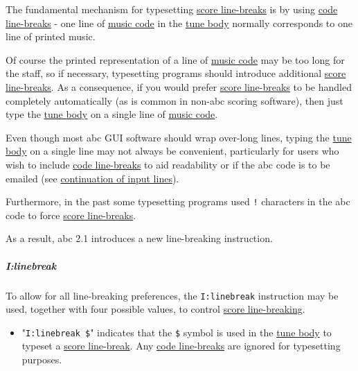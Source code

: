 \documentclass[oneside]{book}
\let\oldsubparagraph\subparagraph
\renewcommand{\subparagraph}[1]{\oldsubparagraph{#1}\mbox{}}
\begin{document}
The fundamental mechanism for typesetting
\protect\hyperlink{score_line-break_definition}{score line-breaks} is by
using \protect\hyperlink{code_line-break_definition}{code line-breaks} -
one line of \protect\hyperlink{music_code_definition}{music code} in the
\protect\hyperlink{tune_body_definition}{tune body} normally corresponds
to one line of printed music.

Of course the printed representation of a line of
\protect\hyperlink{music_code_definition}{music code} may be too long
for the staff, so if necessary, typesetting programs should introduce
additional \protect\hyperlink{score_line-break_definition}{score
line-breaks}. As a consequence, if you would prefer
\protect\hyperlink{score_line-break_definition}{score line-breaks} to be
handled completely automatically (as is common in non-abc scoring
software), then just type the
\protect\hyperlink{tune_body_definition}{tune body} on a single line of
\protect\hyperlink{music_code_definition}{music code}.

Even though most abc GUI software should wrap over-long lines, typing
the \protect\hyperlink{tune_body_definition}{tune body} on a single line
may not always be convenient, particularly for users who wish to include
\protect\hyperlink{code_line-break_definition}{code line-breaks} to aid
readability or if the abc code is to be emailed (see
\protect\hyperlink{continuation_of_input_lines}{continuation of input
lines}).

Furthermore, in the past some typesetting programs used \texttt{!}
characters in the abc code to force
\protect\hyperlink{score_line-break_definition}{score line-breaks}.

As a result, abc 2.1 introduces a new line-breaking instruction.

\subparagraph{I:linebreak}\label{ilinebreak}

To allow for all line-breaking preferences, the \texttt{I:linebreak}
instruction may be used, together with four possible values, to control
\protect\hyperlink{score_line-break_definition}{score line-breaking}.

\begin{itemize}
\item
  "\texttt{I:linebreak\ \$}" indicates that the \texttt{\$} symbol is
  used in the \protect\hyperlink{tune_body_definition}{tune body} to
  typeset a \protect\hyperlink{score_line-break_definition}{score
  line-break}. Any \protect\hyperlink{code_line-break_definition}{code
  line-breaks} are ignored for typesetting purposes.
\end{itemize}
\end{document}
